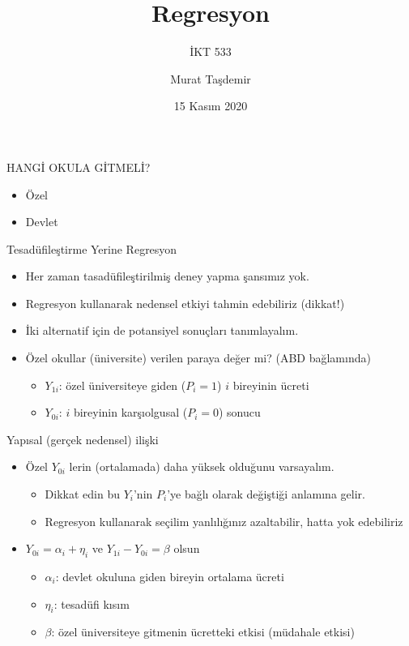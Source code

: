 \documentclass[
  12pt,
  ignorenonframetext,
  fleqn,
  aspectratio=43]{beamer}
\title{Regresyon}
\subtitle{İKT 533}
\author[MT]{Murat Taşdemir}
\date{15 Kasım 2020}
\institute[İMÜ]{İMÜ}
\providecommand{\tightlist}{%
  \setlength{\itemsep}{0pt}\setlength{\parskip}{0pt}}
\let\olditem\item
\renewcommand{\item}{\olditem\vspace{\fill}}
\begin{document}
\frame{\titlepage}

\begin{frame}{HANGİ OKULA GİTMELİ?}
\protect\hypertarget{hangi-okula-gitmeli}{}
\begin{itemize}
\tightlist
\item
  Özel
\item
  Devlet
\end{itemize}
\end{frame}

\begin{frame}{Tesadüfileştirme Yerine Regresyon}
\protect\hypertarget{tesaduxfcfileux15ftirme-yerine-regresyon}{}
\begin{itemize}
\item
  Her zaman tasadüfileştirilmiş deney yapma şansımız yok.
\item
  Regresyon kullanarak nedensel etkiyi tahmin edebiliriz (dikkat!)
\item
  İki alternatif için de potansiyel sonuçları tanımlayalım.
\item
  Özel okullar (üniversite) verilen paraya değer mi? (ABD bağlamında)

  \begin{itemize}
  \tightlist
  \item
    \(Y_{1i}\): özel üniversiteye giden (\(P_i=1\)) \(i\) bireyinin
    ücreti
  \item
    \(Y_{0i}\): \(i\) bireyinin karşıolgusal (\(P_i=0\)) sonucu
  \end{itemize}
\end{itemize}
\end{frame}

\begin{frame}{Yapısal (gerçek nedensel) ilişki}
\protect\hypertarget{yapux131sal-geruxe7ek-nedensel-iliux15fki}{}
\begin{itemize}
\item
  Özel \(Y_{0i}\) lerin (ortalamada) daha yüksek olduğunu varsayalım.

  \begin{itemize}
  \tightlist
  \item
    \alert{Dikkat edin} bu \(Y_i\)'nin \(P_i\)'ye bağlı olarak değiştiği
    anlamına gelir.
  \item
    Regresyon kullanarak seçilim yanlılığınız azaltabilir, hatta yok
    edebiliriz
  \end{itemize}
\item
  \(Y_{0i}=\alpha_i+\eta_i\) ve \(Y_{1i}-Y_{0i}=\beta\) olsun

  \begin{itemize}
  \tightlist
  \item
    \(\alpha_i\): devlet okuluna giden bireyin ortalama ücreti
  \item
    \(\eta_i\): tesadüfi kısım
  \item
    \(\beta\): özel üniversiteye gitmenin ücretteki etkisi (müdahale
    etkisi)
  \end{itemize}
\end{itemize}
\end{frame}
\end{document}

